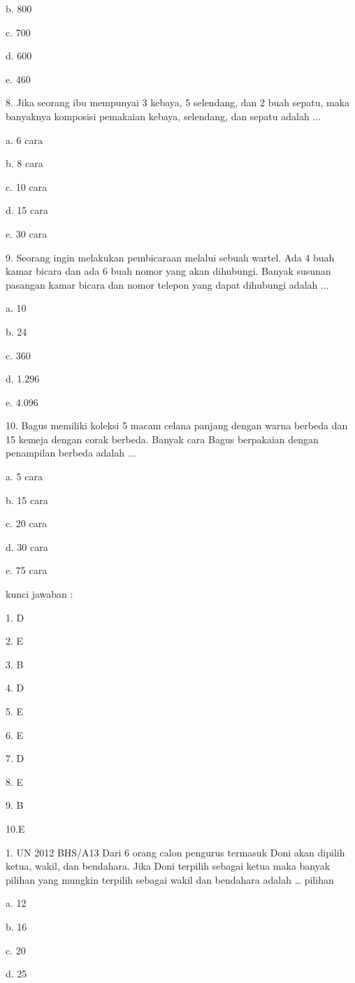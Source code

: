 \documentclass[11pt,fleqn]{book} %
\begin{document}
b.	800

c.	700

d.	600

e.	460


8. Jika seorang ibu mempunyai 3 kebaya, 5 selendang, dan 2 buah sepatu, maka banyaknya komposisi pemakaian kebaya, selendang, dan sepatu adalah ... 

a.	6 cara

b.	8 cara

c.	10 cara

d.	15 cara

e.	30 cara

9. Seorang ingin melakukan pembicaraan melalui sebuah wartel. Ada 4 buah kamar bicara dan ada 6 buah nomor yang akan dihubungi. Banyak susunan pasangan kamar bicara dan nomor telepon yang dapat dihubungi adalah ... 

a.	10

b.	24

c.	360

d.	1.296

e.	4.096

10. Bagus memiliki koleksi 5 macam celana panjang dengan warna berbeda dan 15 kemeja dengan corak berbeda. Banyak cara Bagus berpakaian dengan penampilan berbeda adalah ... 

a.	5 cara

b.	15 cara

c.	20 cara

d.	30 cara

e.	75 cara



kunci jawaban :

1. D

2. E

3. B 

4. D

5. E

6. E

7. D

8. E

9. B

10.E


1.	UN 2012 BHS/A13
Dari 6 orang calon pengurus termasuk Doni akan dipilih ketua, wakil, dan bendahara. Jika Doni terpilih sebagai ketua maka banyak pilihan yang mungkin terpilih sebagai wakil dan bendahara adalah … pilihan

a.	12

b.	16

c.	20

d.	25
\end{document}
